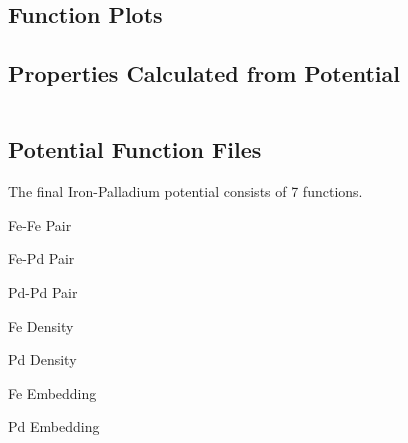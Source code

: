 \begin{lstlisting}[style=sPseudo,caption={Main index file: pd.pot}]
\end{lstlisting}

\begin{lstlisting}[style=sPseudo,caption={Pair function: pd\_pair.pot}]
\end{lstlisting}

\begin{lstlisting}[style=sPseudo,caption={Pair function: pd\_dens.pot}]
\end{lstlisting}

\begin{lstlisting}[style=sPseudo,caption={Pair function: pd\_embe.pot}]
\end{lstlisting}



\FloatBarrier
\subsection{Function Plots}





\FloatBarrier
\subsection{Properties Calculated from Potential}


\begin{lstlisting}[style=sPseudo,caption={Potential Properties}]
\end{lstlisting}










\subsection{Potential Function Files}

The final Iron-Palladium potential consists of 7 functions.

\begin{list}
\item Fe-Fe Pair
\item Fe-Pd Pair
\item Pd-Pd Pair
\item Fe Density
\item Pd Density
\item Fe Embedding
\item Pd Embedding
\end{list}

